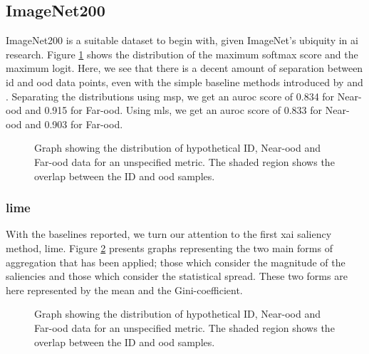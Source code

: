 \documentclass[UKenglish]{uiomasterthesis} %
\theoremstyle{definition}
\begin{document}


\subsection{ImageNet200}

ImageNet200 is a suitable dataset to begin with, given ImageNet's ubiquity in \ac{ai} research. Figure \ref{fig:imagenet200logits} shows the distribution of the maximum softmax score and the maximum logit. Here, we see that there is a decent amount of separation between \ac{id} and \ac{ood} data points, even with the simple baseline methods introduced by \cite{oodbaseline} and \cite{mls}. Separating the distributions using \ac{msp}, we get an \ac{auroc} score of 0.834 for Near-\ac{ood} and 0.915 for Far-\ac{ood}. Using \ac{mls}, we get an \ac{auroc} score of 0.833 for Near-\ac{ood} and 0.903 for Far-\ac{ood}.

\begin{figure}
    \begin{center}
        
    \end{center}
    \caption[Hypothetical ID/\ac{ood} distributions for an \ac{ood} detection metric]{Graph showing the distribution of hypothetical ID, Near-\ac{ood} and Far-\ac{ood} data for an unspecified metric. The shaded region shows the overlap between the ID and \ac{ood} samples.}
    \label{fig:imagenet200logits}
\end{figure}

\subsubsection{\ac{lime}}

With the baselines reported, we turn our attention to the first \ac{xai} saliency method, \ac{lime}. Figure \ref{fig:imagenet200limemeangini} presents graphs representing the two main forms of aggregation that has been applied; those which consider the magnitude of the saliencies and those which consider the statistical spread. These two forms are here represented by the mean and the Gini-coefficient.

\begin{figure}
    \begin{center}
        
    \end{center}
    \caption[Hypothetical ID/\ac{ood} distributions for an \ac{ood} detection metric]{Graph showing the distribution of hypothetical ID, Near-\ac{ood} and Far-\ac{ood} data for an unspecified metric. The shaded region shows the overlap between the ID and \ac{ood} samples.}
    \label{fig:imagenet200limemeangini}
\end{figure}
\end{document}
